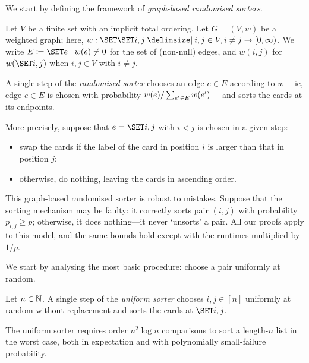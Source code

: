 \documentclass{article}
\begin{document}
We start by defining the framework of \textit{graph-based randomised sorters}.

\begin{defn}%
\label{def:intro:graph}
Let $V$ be a finite set with an implicit total ordering.
Let $G = (V, w)$ be a weighted graph; here, $w : \set{ \set{i,j} \given i,j \in V, i \ne j } \to \coi{0, \infty}$.
We write $E \cq \set{ e \mid w(e) \ne 0 }$ for the set of (non-null) edges, and $w(i,j)$ for $w(\set{i,j})$ when $i,j \in V$ with $i \ne j$.

A single step of the \textit{randomised sorter} chooses an edge $e \in E$ according to $w$%
	---ie, edge $e \in E$ is chosen with probability $w(e) / \sumt{e' \in E} w(e')$---%
and sorts the cards at its endpoints.

More precisely, suppose that $e = \set{i, j}$ with $i < j$ is chosen in a given step:
\begin{itemize}[noitemsep]
	\item 
	swap the cards if the label of the card in position $i$ is larger than that in position $j$;
	
	\item 
	otherwise, do nothing, leaving the cards in ascending order.
\end{itemize}
\end{defn}

\begin{rmkt}
\label{rmk:intro:robust}
This graph-based randomised sorter is robust to mistakes.
Suppose that the sorting mechanism may be faulty:
	it correctly sorts pair $(i,j)$ with probability $p_{i,j} \ge p$;
	otherwise, it does nothing---it never `unsorts' a pair.
All our proofs apply to this model, and the same bounds hold except with the runtimes multiplied by $1/p$.
\end{rmkt}

We start by analysing the most basic procedure: choose a pair uniformly at random.

\begin{thm}
\label{res:intro:unif}
Let $n \in \mathbb{N}$.
A single step of the \textit{uniform sorter} chooses $i,j \in [n]$ uniformly at random without replacement and sorts the cards at $\set{i,j}$.

The uniform sorter
requires order $n^2 \log n$ comparisons to sort a length-$n$ list in the worst case,
both in expectation and with polynomially small-failure probability.
\end{thm}
\end{document}
